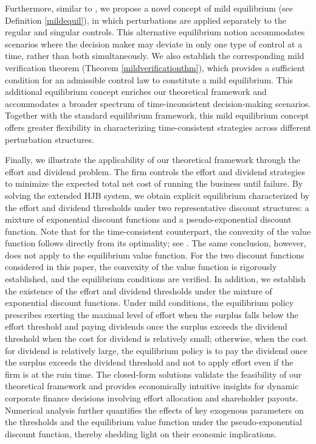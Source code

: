 \documentclass[11pt,reqno]{article}%
\numberwithin{equation}{section}
\begin{document}
 Furthermore, similar to \citet{liang2023weak}, we propose a novel concept of mild equilibrium (see Definition \ref{mildequil}), in which perturbations are applied separately to the regular and singular controls. This alternative equilibrium notion accommodates scenarios where the decision maker may deviate in only one type of control at a time, rather than both simultaneously. We also establish the corresponding mild verification theorem (Theorem \ref{mildverificationthm}), which provides a sufficient condition for an admissible control law to constitute a mild equilibrium. This additional equilibrium concept enriches our theoretical framework and accommodates a broader spectrum of time-inconsistent decision-making scenarios. Together with the standard equilibrium framework, this mild equilibrium concept offers greater flexibility in characterizing time-consistent strategies across different perturbation structures.

Finally, we illustrate the applicability of our theoretical framework through the effort and dividend problem. The firm controls the effort and dividend strategies to minimize the expected total net cost of running the business until failure. By solving the extended HJB system, we obtain explicit equilibrium characterized by the effort and dividend thresholds under two representative discount structures: a mixture of exponential discount functions and a pseudo-exponential discount function. Note that for the time-consistent counterpart, the convexity of the value function follows directly from its optimality; see \citet[Proposition 1.1]{jgaard1999controlling}. The same conclusion, however, does not apply to the equilibrium value function. For the two discount functions considered in this paper, the convexity of the value function is rigorously established, and the equilibrium conditions are verified. In addition, we establish the existence of the effort and dividend thresholds under the mixture of exponential discount functions. Under mild conditions, the equilibrium policy prescribes exerting the maximal level of effort when the surplus falls below the effort threshold and paying dividends once the surplus exceeds the dividend threshold when the cost for dividend is relatively small; otherwise, when the cost for dividend is relatively large, the equilibrium policy is to pay the dividend once the surplus exceeds the dividend threshold and not to apply effort even if the firm is at the ruin time. The closed-form solutions validate the feasibility of our theoretical framework and provides economically intuitive insights for dynamic corporate finance decisions involving effort allocation and shareholder payouts. Numerical analysis further quantifies the effects of key exogenous parameters on the thresholds and the equilibrium value function under the pseudo-exponential discount function, thereby shedding light on their economic implications.
\end{document}
